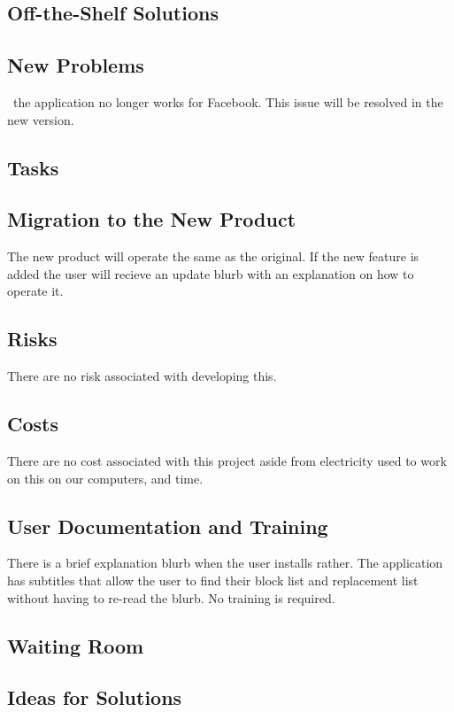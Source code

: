 \documentclass[12pt, titlepage]{article}
\begin{document}
\subsection{Off-the-Shelf Solutions}

\subsection{New Problems}\
the application no longer works for Facebook. This issue will be resolved in the new version.

\subsection{Tasks}

\subsection{Migration to the New Product}
The new product will operate the same as the original. If the new feature is added the user will recieve an update blurb with an explanation on how to operate it. 

\subsection{Risks}
There are no risk associated with developing this.

\subsection{Costs}
There are no cost associated with this project aside from electricity used to work on this on our computers, and time. 

\subsection{User Documentation and Training}
There is a brief explanation blurb when the user installs rather. The application has subtitles that allow the user to find their block list and replacement list without having to re-read the blurb. No training is required.

\subsection{Waiting Room}

\subsection{Ideas for Solutions}
\end{document}
